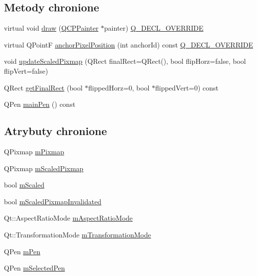 \subsection*{Metody chronione}
\begin{DoxyCompactItemize}
\item 
virtual void \hyperlink{class_q_c_p_item_pixmap_a9538a7d37fe20a4ff4bb2cb5bbbf2b48}{draw} (\hyperlink{class_q_c_p_painter}{Q\+C\+P\+Painter} $\ast$painter) \hyperlink{qcustomplot_8hh_a42cc5eaeb25b85f8b52d2a4b94c56f55}{Q\+\_\+\+D\+E\+C\+L\+\_\+\+O\+V\+E\+R\+R\+I\+DE}
\item 
virtual Q\+PointF \hyperlink{class_q_c_p_item_pixmap_a5803d8e173bc4d48619fc43701db32e5}{anchor\+Pixel\+Position} (int anchor\+Id) const \hyperlink{qcustomplot_8hh_a42cc5eaeb25b85f8b52d2a4b94c56f55}{Q\+\_\+\+D\+E\+C\+L\+\_\+\+O\+V\+E\+R\+R\+I\+DE}
\item 
void \hyperlink{class_q_c_p_item_pixmap_a8bced3027b326b290726cd1979c7cfc6}{update\+Scaled\+Pixmap} (Q\+Rect final\+Rect=Q\+Rect(), bool flip\+Horz=false, bool flip\+Vert=false)
\item 
Q\+Rect \hyperlink{class_q_c_p_item_pixmap_a245ef0c626cab7096a810442f2f6a2d9}{get\+Final\+Rect} (bool $\ast$flipped\+Horz=0, bool $\ast$flipped\+Vert=0) const 
\item 
Q\+Pen \hyperlink{class_q_c_p_item_pixmap_af21085516585c475dc9d839e7f377233}{main\+Pen} () const 
\end{DoxyCompactItemize}
\subsection*{Atrybuty chronione}
\begin{DoxyCompactItemize}
\item 
Q\+Pixmap \hyperlink{class_q_c_p_item_pixmap_a1396cce7f26c7b8e9512906284380c4d}{m\+Pixmap}
\item 
Q\+Pixmap \hyperlink{class_q_c_p_item_pixmap_a2ebc66e15b9f1264563d58f29ba1bc00}{m\+Scaled\+Pixmap}
\item 
bool \hyperlink{class_q_c_p_item_pixmap_a8fe670a529cd46a9b8afd9fc1203bc3f}{m\+Scaled}
\item 
bool \hyperlink{class_q_c_p_item_pixmap_a223134abd4cf3d6c368573c622bd2e1c}{m\+Scaled\+Pixmap\+Invalidated}
\item 
Qt\+::\+Aspect\+Ratio\+Mode \hyperlink{class_q_c_p_item_pixmap_a8dc6b6c1e106ac523efae22d5fe55bab}{m\+Aspect\+Ratio\+Mode}
\item 
Qt\+::\+Transformation\+Mode \hyperlink{class_q_c_p_item_pixmap_ac9ecad3b9842363754e32eda2cf821bd}{m\+Transformation\+Mode}
\item 
Q\+Pen \hyperlink{class_q_c_p_item_pixmap_acfee1124eb51a1887aaf8de10777c7a1}{m\+Pen}
\item 
Q\+Pen \hyperlink{class_q_c_p_item_pixmap_a0949e5bb6a261fc4e9668e28e2effcfa}{m\+Selected\+Pen}
\end{DoxyCompactItemize}
